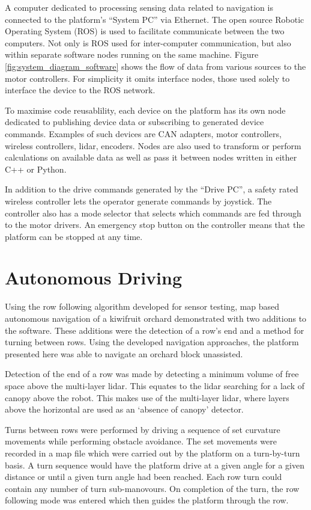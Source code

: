 \documentclass[preprint,authoryear,12pt]{elsarticle}
\begin{document}
    A computer dedicated to processing sensing data related to navigation is connected to the platform's ``System PC'' via Ethernet.
    The open source Robotic Operating System (ROS) is used to facilitate communicate between the two computers.
    Not only is ROS used for inter-computer communication, but also within separate software nodes running on the same machine.
    Figure \ref{fig:system_diagram_software} shows the flow of data from various sources to the motor controllers.
    For simplicity it omits interface nodes, those used solely to interface the device to the ROS network.

    To maximise code reusablility, each device on the platform has its own node dedicated to publishing device data or subscribing to generated device commands.
    Examples of such devices are CAN adapters, motor controllers, wireless controllers, lidar, encoders.
    Nodes are also used to transform or perform calculations on available data as well as pass it between nodes written in either C++ or Python.

    In addition to the drive commands generated by the ``Drive PC'', a safety rated wireless controller lets the operator generate commands by joystick.
    The controller also has a mode selector that selects which commands are fed through to the motor drivers.
    An emergency stop button on the controller means that the platform can be stopped at any time.


\section{Autonomous Driving}
\label{sect:autonomous}
    Using the row following algorithm developed for sensor testing, map based autonomous navigation of a kiwifruit orchard demonstrated with two additions to the software.
    These additions were the detection of a row's end and a method for turning between rows.
    Using the developed navigation approaches, the platform presented here was able to navigate an orchard block unassisted.

    Detection of the end of a row was made by detecting a minimum volume of free space above the multi-layer lidar.
    This equates to the lidar searching for a lack of canopy above the robot.
    This makes use of the multi-layer lidar, where layers above the horizontal are used as an `absence of canopy' detector.

    Turns between rows were performed by driving a sequence of set curvature movements while performing obstacle avoidance.
    The set movements were recorded in a map file which were carried out by the platform on a turn-by-turn basis.
    A turn sequence would have the platform drive at a given angle for a given distance or until a given turn angle had been reached.
    Each row turn could contain any number of turn sub-manovours.
    On completion of the turn, the row following mode was entered which then guides the platform through the row.
\end{document}
